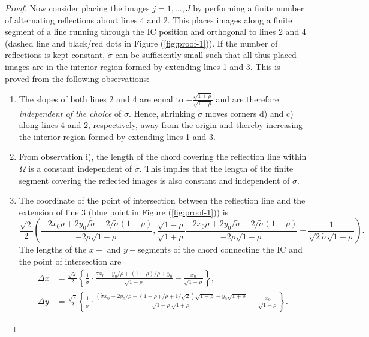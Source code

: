 \begin{proof}
  Now consider placing the images $j = 1, \ldots, J$ by performing a
  finite number of alternating reflections about lines 4 and 2. This
  places images along a finite segment of a line running through the
  IC position and orthogonal to lines 2 and 4 (dashed line and
  black/red dots in Figure (\ref{fig:proof-1})). If the number of
  reflections is kept constant, $\tilde{\sigma}$ can be sufficiently
  small such that all thus placed images are in the interior region
  formed by extending lines 1 and 3. This is proved from the following
  observations:
  \begin{enumerate}
  \item The slopes of both lines 2 and 4 are equal to
    $-\frac{\sqrt{1+\rho}}{\sqrt{1-\rho}}$ and are therefore
    \textit{independent of the choice} of $\tilde{\sigma}$. Hence,
    shrinking $\tilde{\sigma}$ moves corners d) and c) along lines 4
    and 2, respectively, away from the origin and thereby increasing
    the interior region formed by extending lines 1 and 3.
  \item From observation i), the length of the chord covering the
    reflection line within $\Omega$ is a constant independent of
    $\tilde{\sigma}$.  This implies that the length of the finite
    segment covering the reflected images is also constant and
    independent of $\tilde{\sigma}$.
  \item The coordinate of the point of intersection between the
    reflection line and the extension of line 3 (blue point in Figure
    (\ref{fig:proof-1})) is
    \[
      \frac{\sqrt{2}}{2} \left( \frac{-2 x_0\rho + 2
          y_0/\tilde{\sigma} -
          2/\tilde{\sigma}(1-\rho)}{-2\rho\sqrt{1-\rho}},
        \frac{\sqrt{1-\rho}}{\sqrt{1+\rho}}\frac{-2 x_0\rho + 2
          y_0/\tilde{\sigma} -
          2/\tilde{\sigma}(1-\rho)}{-2\rho\sqrt{1-\rho}} +
        \frac{1}{\sqrt{2}\tilde{\sigma}\sqrt{1+\rho}} \right).
    \]
    The lengths of the $x-$ and $y-$segments of the chord connecting
    the IC and the point of intersection are
    \begin{align*}
      \Delta x &= \frac{\sqrt{2}}{2}\left\{ \frac{1}{\tilde{\sigma}}\cdot\frac{\tilde{\sigma}x_0 - y_0/\rho + (1-\rho)/\rho + y_0}{\sqrt{1-\rho}} - \frac{x_0}{\sqrt{1-\rho}} \right\},\\
      \Delta y &= \frac{\sqrt{2}}{2} \left\{ \frac{1}{\tilde{\sigma}}\cdot\frac{(\tilde{\sigma}x_0 - 2y_0/\rho + (1-\rho)/\rho + 1/\sqrt{2})\sqrt{1-\rho} - y_0\sqrt{1+\rho}}{\sqrt{1-\rho}\sqrt{1+\rho}}- \frac{x_0}{\sqrt{1-\rho}} \right\}.
    \end{align*}

\end{enumerate}
\end{proof}

